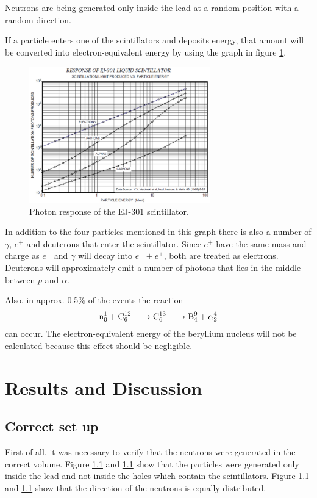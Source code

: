 \documentclass[12pt]{article}
\begin{document}
Neutrons are being generated only inside the lead at a random position with a random direction.

If a particle enters one of the scintillators and deposits energy, that amount will be converted into electron-equivalent energy by using the graph in figure \ref{fig:photonResponse}.

\begin{figure}[htbp]
	\centering
	\includegraphics[width=0.7\textwidth]{./pics/scintillatorResponse.pdf}
	\caption{Photon response of the EJ-301 scintillator.}
	\label{fig:photonResponse}
\end{figure}
In addition to the four particles mentioned in this graph there is also a number of $\gamma$, $e^+$ and deuterons that enter the scintillator. Since $e^+$ have the same mass and charge as $e^-$ and $\gamma$ will decay into $e^- + e^+$, both are treated as electrons. Deuterons will approximately emit a number of photons that lies in the middle between $p$ and $\alpha$. 

Also, in approx. 0.5\% of the events the reaction 
\begin{align}
	\ce{n^1_0 + C^{12}_6 -> C^{13}_6 -> B^9_4 + \alpha^4_2 } 
\end{align}
can occur. The electron-equivalent energy of the beryllium nucleus will not be calculated because this effect should be negligible.

\section{Results and Discussion}

\subsection{Correct set up}

First of all, it was necessary to verify that the neutrons were generated in the correct volume. Figure \ref{} and \ref{} show that the particles were generated only inside the lead and not inside the holes which contain the scintillators. Figure \ref{} and \ref{} show that the direction of the neutrons is equally distributed.
\end{document}

